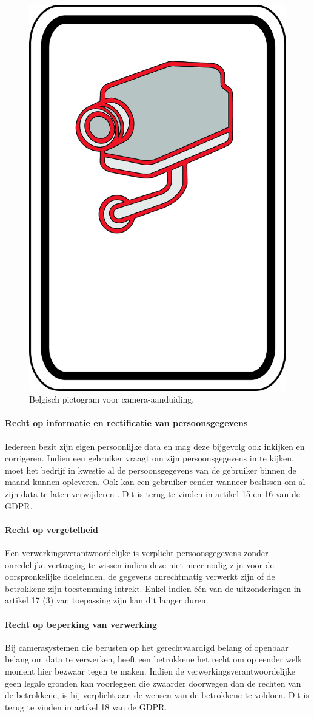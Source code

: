 \begin{figure}[h!]
	\centering
	\includegraphics[width=.5\linewidth]{img/anpr-aanduiding.png}
	\caption{Belgisch pictogram voor camera-aanduiding. \autocite{besafe2018picto}}
	\label{anpr-aanduiding}
\end{figure}

\paragraph{Recht op informatie en rectificatie van persoonsgegevens} 
Iedereen bezit zijn eigen persoonlijke data en mag deze bijgevolg ook inkijken en corrigeren. Indien een gebruiker vraagt om zijn persoonsgegevens in te kijken, moet het bedrijf in kwestie al de persoonsgegevens van de gebruiker binnen de maand kunnen opleveren. Ook kan een gebruiker eender wanneer beslissen om al zijn data te laten verwijderen \autocite{avg2018privacy}. Dit is terug te vinden in artikel 15 en 16 van de GDPR.

\paragraph{Recht op vergetelheid}
Een verwerkingsverantwoordelijke is verplicht persoonsgegevens zonder onredelijke vertraging te wissen indien deze niet meer nodig zijn voor de oorspronkelijke doeleinden, de gegevens onrechtmatig verwerkt zijn of de betrokkene zijn toestemming intrekt. Enkel indien één van de uitzonderingen in artikel 17 (3) van toepassing zijn kan dit langer duren. \autocite{edpb2019guidelines}

\paragraph{Recht op beperking van verwerking}
Bij camerasystemen die berusten op het gerechtvaardigd belang of openbaar belang om data te verwerken, heeft een betrokkene het recht om op eender welk moment hier bezwaar tegen te maken. Indien de verwerkingsverantwoordelijke geen legale gronden kan voorleggen die zwaarder doorwegen dan de rechten van de betrokkene, is hij verplicht aan de wensen van de betrokkene te voldoen. Dit is terug te vinden in artikel 18 van de GDPR.

